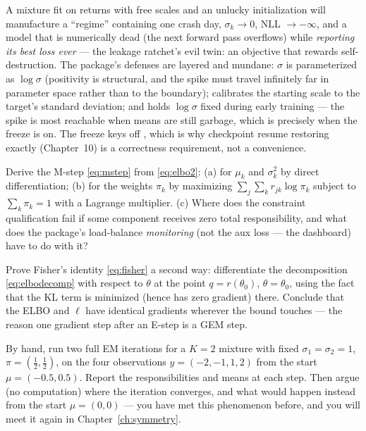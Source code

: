\begin{whatbreaks}
A mixture fit on returns with free scales and an unlucky initialization
will manufacture a ``regime'' containing one crash day, $\sigma_k
\to 0$, NLL $\to -\infty$, and a model that is numerically dead (the next
forward pass overflows) while \emph{reporting its best loss ever} --- the
leakage ratchet's evil twin: an objective that rewards self-destruction.
The package's defenses are layered and mundane: $\sigma$ is parameterized
as $\log \sigma$ (positivity is structural, and the spike must travel
infinitely far in parameter space rather than to the boundary);
 calibrates the starting scale to the target's standard
deviation; and  holds $\log\sigma$ fixed during
early training --- the spike is most reachable when means are still
garbage, which is precisely when the freeze is on. The freeze keys off
, which is why checkpoint resume restoring
 exactly (Chapter~10) is a correctness
requirement, not a convenience.
\end{whatbreaks}

\exercisehead

\begin{exercise}\label{ex:4-mstep}
Derive the M-step \eqref{eq:mstep} from \eqref{eq:elbo2}: (a) for
$\mu_k$ and $\sigma_k^2$ by direct differentiation; (b) for the weights
$\pi_k$ by maximizing $\sum_j \sum_k r_{jk} \log \pi_k$ subject to
$\sum_k \pi_k = 1$ with a Lagrange multiplier. (c) Where does the
constraint qualification fail if some component receives zero total
responsibility, and what does the package's load-balance \emph{monitoring}
(not the aux loss --- the dashboard) have to do with it?
\end{exercise}

\begin{exercise}\label{ex:4-fisher}
Prove Fisher's identity \eqref{eq:fisher} a second way: differentiate the
decomposition \eqref{eq:elbodecomp} with respect to $\theta$ at the point
$q = r(\theta_0)$, $\theta = \theta_0$, using the fact that the KL term is
minimized (hence has zero gradient) there. Conclude that the ELBO and
$\ell$ have identical gradients wherever the bound touches --- the reason
one gradient step after an E-step is a GEM step.
\end{exercise}

\begin{exercise}\label{ex:4-handem}
By hand, run two full EM iterations for a $K = 2$ mixture with fixed
$\sigma_1 = \sigma_2 = 1$, $\pi = (\tfrac12, \tfrac12)$, on the four
observations $y = (-2, -1, 1, 2)$ from the start $\mu = (-0.5, 0.5)$.
Report the responsibilities and means at each step. Then argue (no
computation) where the iteration converges, and what would happen instead
from the start $\mu = (0, 0)$ --- you have met this phenomenon before, and
you will meet it again in Chapter~\ref{ch:symmetry}.
\end{exercise}

